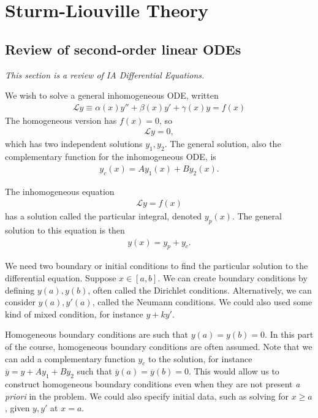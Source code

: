 \section{Sturm-Liouville Theory}

\subsection{Review of second-order linear ODEs}
\textit{This section is a review of IA Differential Equations.}

We wish to solve a general inhomogeneous ODE, written
\begin{align} \label{eq:2.1}
    \mathcal L y \equiv \alpha(x) y'' + \beta(x) y' + \gamma(x) y = f(x)
\end{align}
The homogeneous version has $f(x) = 0$, so \begin{align} \label{eq:2.2}
    \mathcal{L}y = 0,
\end{align} which has two independent solutions $y_1, y_2$.
The general solution, also the complementary function for the inhomogeneous ODE, is 
\begin{align}
    y_c(x) = A y_1(x) + B y_2(x). \label{eq:2.3}
\end{align}

The inhomogeneous equation 
\begin{align}
    \mathcal L y = f(x) \label{eq:2.4}
\end{align} has a solution called the particular integral, denoted $y_p(x)$.
The general solution to this equation is then 
\begin{align} \label{eq:2.5}
    y(x) = y_p + y_c.
\end{align}

We need two boundary or initial conditions to find the particular solution to the differential equation.
Suppose $x \in [a,b]$.
We can create boundary conditions by defining $y(a), y(b)$, often called the Dirichlet conditions.
Alternatively, we can consider $y(a), y'(a)$, called the Neumann conditions.
We could also used some kind of mixed condition, for instance $y + ky'$.

Homogeneous boundary conditions are such that $y(a) = y(b) = 0$.
In this part of the course, homogeneous boundary conditions are often assumed.
Note that we can add a complementary function $y_c$ to the solution, for instance $\overline{y} = y + A y_1 + B y_2$ such that $\overline{y}(a) = \overline{y}(b) = 0$.
This would allow us to construct homogeneous boundary conditions even when they are not present \textit{a priori} in the problem.
We could also specify initial data, such as solving for $x \geq a$, given $y, y'$ at $x = a$.

